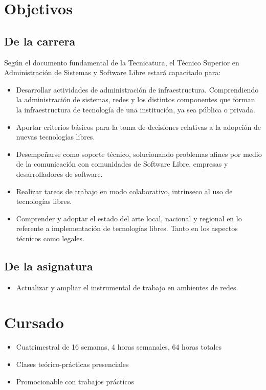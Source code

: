 
\section{Objetivos}
\subsection{De la carrera}
Según el documento fundamental de la Tecnicatura, el Técnico Superior en Administración de Sistemas y Software Libre estará capacitado para:
\begin{itemize}
	\item Desarrollar actividades de administración de infraestructura. Comprendiendo la administración de sistemas, redes y los distintos componentes que forman la
infraestructura de tecnología de una institución, ya sea pública o privada.
	\item Aportar criterios básicos para la toma de decisiones relativas a la adopción de nuevas tecnologías libres.
	\item Desempeñarse como soporte técnico, solucionando problemas afines por medio de la comunicación con comunidades de Software Libre, empresas y desarrolladores de
software.
	\item Realizar tareas de trabajo en modo colaborativo, intrínseco al uso de tecnologías libres.
	\item Comprender y adoptar el estado del arte local, nacional y regional en lo referente a implementación de tecnologías libres. Tanto en los aspectos técnicos como legales.
\end{itemize}
\subsection{De la asignatura}

\begin{itemize}
	\item Actualizar y ampliar el instrumental de trabajo en ambientes de redes.
\end{itemize}


\section{Cursado}
\begin{itemize}
	\item Cuatrimestral de 16 semanas, 4 horas semanales, 64 horas totales
	\item Clases teórico-prácticas presenciales
	\item Promocionable con trabajos prácticos
\end{itemize}


